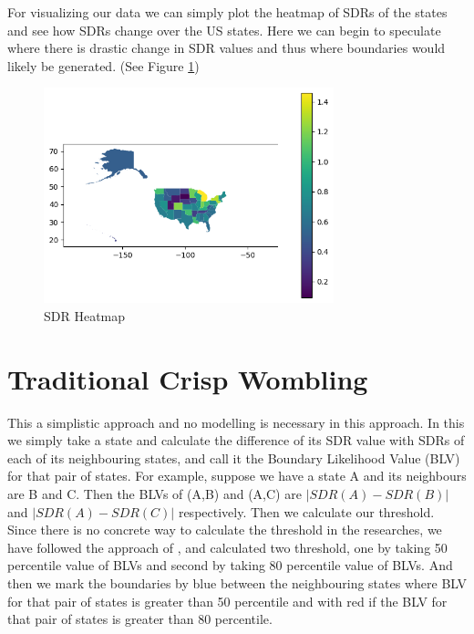 \documentclass[enabledeprecatedfontcommands,parskip=half,twoside=semi,BCOR=0mm]{scrreprt}
\numberwithin{equation}{chapter}
\theoremstyle{definition}
\theoremstyle{remark}
\begin{document}
    For visualizing our data we can simply plot the heatmap of SDRs of the states and see how SDRs change over the US states. Here we can begin to speculate where there is drastic change in SDR values and thus where boundaries would likely be generated. (See Figure \ref{fig:Figure 2})
    \begin{figure}[h]
    \centering
    \includegraphics[width=0.75\textwidth]{SDR.png}
    \caption{SDR Heatmap}
    \label{fig:Figure 2}
    \end{figure}
    
    \section{Traditional Crisp Wombling}
    
    This a simplistic approach and no modelling is necessary in this approach. In this we simply take a state and calculate the difference of its SDR value with SDRs of each of its neighbouring states, and call it the Boundary Likelihood Value (BLV) for that pair of states. For example, suppose we have a state A and its neighbours are B and C. Then the BLVs of (A,B) and (A,C) are \(|SDR(A)-SDR(B)|\) and \(|SDR(A)-SDR(C)|\) respectively. Then we calculate our threshold. Since there is no concrete way to calculate the threshold in the researches, we have followed the approach of \cite{Lu_Carlin.2005}, and calculated two threshold, one by taking 50 percentile value of BLVs and second by taking 80 percentile value of BLVs. And then we mark the boundaries by blue between the neighbouring states where BLV for that pair of states is greater than 50 percentile and with red if the BLV for that pair of states is greater than 80 percentile.
\end{document}
